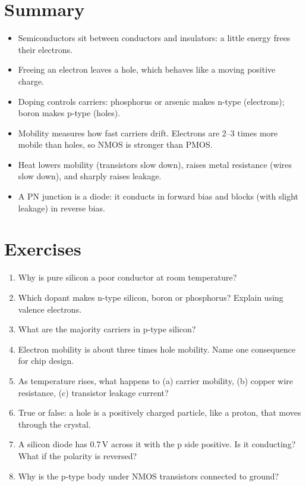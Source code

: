 \section{Summary}

\begin{itemize}
  \item Semiconductors sit between conductors and insulators: a little energy frees their electrons.
  \item Freeing an electron leaves a hole, which behaves like a moving positive charge.
  \item Doping controls carriers: phosphorus or arsenic makes n-type (electrons); boron makes p-type (holes).
  \item Mobility measures how fast carriers drift. Electrons are 2--3 times more mobile than holes, so NMOS is stronger than PMOS.
  \item Heat lowers mobility (transistors slow down), raises metal resistance (wires slow down), and sharply raises leakage.
  \item A PN junction is a diode: it conducts in forward bias and blocks (with slight leakage) in reverse bias.
\end{itemize}

\section{Exercises}

\begin{enumerate}
  \item Why is pure silicon a poor conductor at room temperature?
  \item Which dopant makes n-type silicon, boron or phosphorus? Explain using valence electrons.
  \item What are the majority carriers in p-type silicon?
  \item Electron mobility is about three times hole mobility. Name one consequence for chip design.
  \item As temperature rises, what happens to (a) carrier mobility, (b) copper wire resistance, (c) transistor leakage current?
  \item True or false: a hole is a positively charged particle, like a proton, that moves through the crystal.
  \item A silicon diode has 0.7\,V across it with the p side positive. Is it conducting? What if the polarity is reversed?
  \item Why is the p-type body under NMOS transistors connected to ground?
\end{enumerate}


